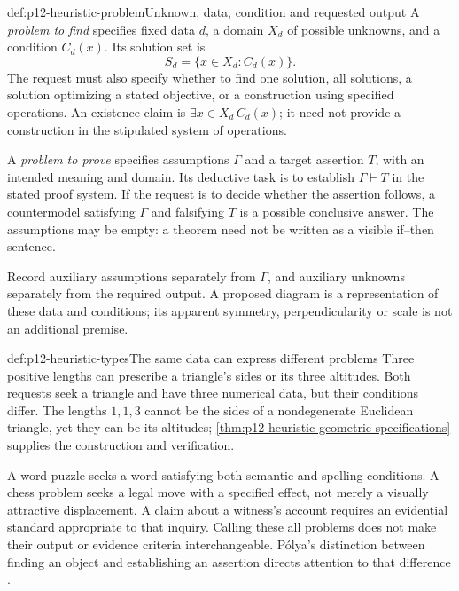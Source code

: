 \begin{hbdefinition}{def:p12-heuristic-problem}{Unknown, data, condition and requested output}
A \emph{problem to find} specifies fixed data \(d\), a domain
\(X_d\) of possible unknowns, and a condition \(C_d(x)\).
Its solution set is
\[
             S_d=\{x\in X_d:C_d(x)\}.
\]
The request must also specify whether to find one solution, all
solutions, a solution optimizing a stated objective, or a construction
using specified operations. An existence claim is
\(\exists x\in X_d\,C_d(x)\); it need not provide a construction
in the stipulated system of operations.

A \emph{problem to prove} specifies assumptions \(\Gamma\) and a
target assertion \(T\), with an intended meaning and domain. Its
deductive task is to establish \(\Gamma\vdash T\) in the stated
proof system. If the request is to decide whether the assertion follows,
a countermodel satisfying \(\Gamma\) and falsifying \(T\) is a
possible conclusive answer. The assumptions may be empty: a theorem
need not be written as a visible if--then sentence.

Record auxiliary assumptions separately from \(\Gamma\), and auxiliary
unknowns separately from the required output. A proposed diagram is a
representation of these data and conditions; its apparent symmetry,
perpendicularity or scale is not an additional premise.
\end{hbdefinition}

\begin{hbexample}{def:p12-heuristic-types}{The same data can express different problems}
Three positive lengths can prescribe a triangle's sides or its three
altitudes. Both requests seek a triangle and have three numerical data,
but their conditions differ. The lengths \(1,1,3\) cannot be the
sides of a nondegenerate Euclidean triangle, yet they can be its
altitudes; \cref{thm:p12-heuristic-geometric-specifications} supplies
the construction and verification.

A word puzzle seeks a word satisfying both semantic and spelling
conditions. A chess problem seeks a legal move with a specified effect,
not merely a visually attractive displacement. A claim about a witness's
account requires an evidential standard appropriate to that inquiry.
Calling these all problems does not make their output or evidence
criteria interchangeable. P\'olya's distinction between finding an object
and establishing an assertion directs attention to that difference
\cite[Part~III, ``Problems to find, problems to prove'' and
``What is the unknown?'']{Polya2004HowToSolveItSelected}.
\end{hbexample}

